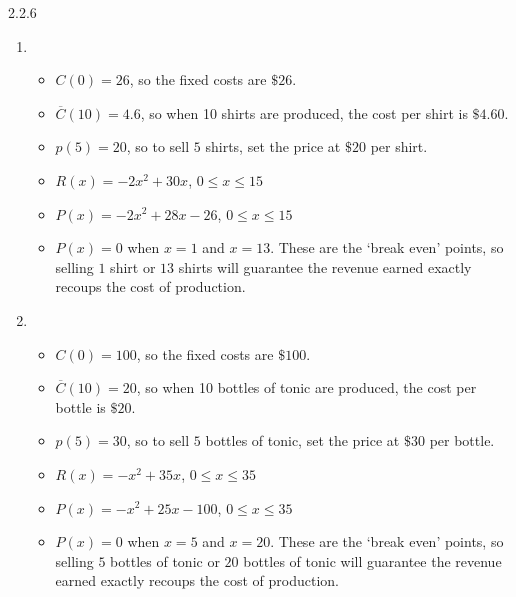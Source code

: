 \begin{Answer}{2.2.6}
	\begin{enumerate}

		\item \begin{itemize}

			\item  $C(0) = 26$, so the fixed costs are $\$26$.

			\item  $\overline{C}(10) = 4.6$, so when 10 shirts are produced, the cost per shirt is $\$4.60$.

			\item  $p(5) = 20$, so to sell $5$ shirts, set the price at $\$20$ per shirt.

			\item $R(x) = -2x^2+30x$, $0 \leq x \leq 15$

			\item  $P(x) = -2x^2+28x-26$, $0 \leq x \leq 15$

			\item  $P(x) = 0$ when $x = 1$ and $x=13$.  These are the `break even' points, so selling $1$ shirt or $13$ shirts will guarantee the revenue earned exactly recoups the cost of production.

		\end{itemize}


		\item \begin{itemize}

			\item  $C(0) = 100$, so the fixed costs are $\$100$.

			\item  $\overline{C}(10) = 20$, so when 10 bottles of tonic are produced, the cost per bottle is $\$20$.

			\item  $p(5) = 30$, so to sell $5$ bottles of tonic, set the price at $\$30$ per bottle.

			\item $R(x) = -x^2+35x$, $0 \leq x \leq 35$

			\item  $P(x) = -x^2+25x-100$, $0 \leq x \leq 35$

			\item  $P(x) = 0$ when $x = 5$ and $x=20$.  These are the `break even' points, so selling $5$ bottles of tonic or $20$ bottles of tonic will guarantee the revenue earned exactly recoups the cost of production.


\end{itemize}
\end{enumerate}
\end{Answer}
